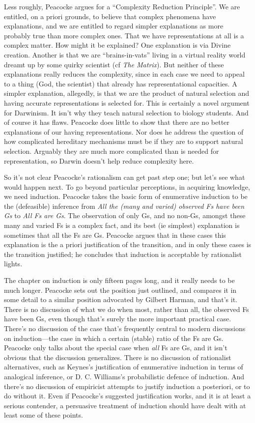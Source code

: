 \documentclass[
  10pt,
  letterpaper,
  DIV=11,
  numbers=noendperiod,
  twoside]{scrartcl}
\begin{document}
Less roughly, Peacocke argues for a ``Complexity Reduction Principle''.
We are entitled, on a priori grounds, to believe that complex phenomena
have explanations, and we are entitled to regard simpler explanations as
more probably true than more complex ones. That we have representations
at all is a complex matter. How might it be explained? One explanation
is via Divine creation. Another is that we are ``brains-in-vats'' living
in a virtual reality world dreamt up by some quirky scientist (cf
\emph{The Matrix}). But neither of these explanations really reduces the
complexity, since in each case we need to appeal to a thing (God, the
scientist) that already has representational capacities. A simpler
explanation, allegedly, is that we are the product of natural selection
and having accurate representations is selected for. This is certainly a
novel argument for Darwinism. It isn't why they teach natural selection
to biology students. And of course it has flaws. Peacocke does little to
show that there are no better explanations of our having
representations. Nor does he address the question of how complicated
hereditary mechanisms must be if they are to support natural selection.
Arguably they are much more complicated than is needed for
representation, so Darwin doesn't help reduce complexity here.

So it's not clear Peacocke's rationalism can get past step one; but
let's see what would happen next. To go beyond particular perceptions,
in acquiring knowledge, we need induction. Peacocke takes the basic form
of enumerative induction to be the (defeasible) inference from \emph{All
the (many and varied) observed Fs have been Gs} to \emph{All Fs are Gs}.
The observation of only Gs, and no non-Gs, amongst these many and varied
Fs is a complex fact, and its best (ie simplest) explanation is
sometimes that all the Fs are Gs. Peacocke argues that in these cases
this explanation is the a priori justification of the transition, and in
only these cases is the transition justified; he concludes that
induction is acceptable by rationalist lights.

The chapter on induction is only fifteen pages long, and it really needs
to be much longer. Peacocke sets out the position just outlined, and
compares it in some detail to a similar position advocated by Gilbert
Harman, and that's it. There is no discussion of what we do when most,
rather than all, the observed Fs have been Gs, even though that's surely
the more important practical case. There's no discussion of the case
that's frequently central to modern discussions on induction---the case
in which a certain (stable) ratio of the Fs are Gs. Peacocke only talks
about the special case when \emph{all} Fs are Gs, and it isn't obvious
that the discussion generalizes. There is no discussion of rationalist
alternatives, such as Keynes's justification of enumerative induction in
terms of analogical inference, or D. C. Williams's probabilistic defence
of induction. And there's no discussion of empiricist attempts to
justify induction a posteriori, or to do without it. Even if Peacocke's
suggested justification works, and it is at least a serious contender, a
persuasive treatment of induction should have dealt with at least some
of these points.
\end{document}
